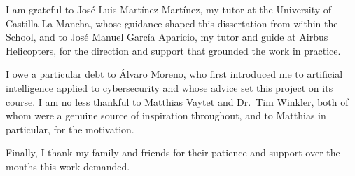 \begin{sloppypar}
I am grateful to José Luis Martínez Martínez, my tutor at the University of
Castilla-La Mancha, whose guidance shaped this dissertation from within the School,
and to José Manuel García Aparicio, my tutor and guide at Airbus Helicopters, for the
direction and support that grounded the work in practice.
\end{sloppypar}

I owe a particular debt to Álvaro Moreno, who first introduced me to artificial
intelligence applied to cybersecurity and whose advice set this project on its
course. I am no less thankful to Matthias Vaytet and Dr.~Tim Winkler, both of whom
were a genuine source of inspiration throughout, and to Matthias in particular,
for the motivation.

Finally, I thank my family and friends for their patience and support over the months
this work demanded.
